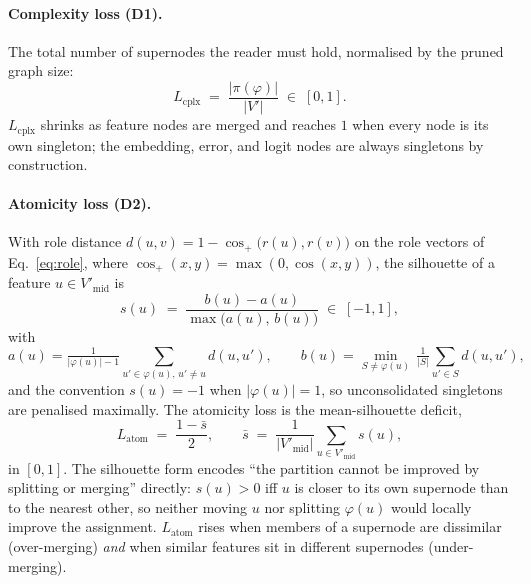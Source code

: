     \paragraph{Complexity loss (D1).}
    The total number of supernodes the reader must hold, normalised by
    the pruned graph size:
    \begin{equation}
    L_{\text{cplx}}
    \;=\;
    \frac{|\pi(\varphi)|}{|V'|}
    \;\in\; [0, 1].
    \label{eq:Lcplx}
    \end{equation}
    $L_{\text{cplx}}$ shrinks as feature nodes are merged and reaches
    $1$ when every node is its own singleton; the embedding, error, and
    logit nodes are always singletons by construction.

    \paragraph{Atomicity loss (D2).}
    With role distance $d(u, v) = 1 - \cos_{+}\!\bigl(r(u), r(v)\bigr)$ on
    the role vectors of Eq.~\eqref{eq:role}, where
    $\cos_{+}(x, y) = \max(0, \cos(x, y))$, the silhouette of a feature
    $u \in V'_{\text{mid}}$ is
    \begin{equation}
    s(u)
    \;=\;
    \frac{b(u) - a(u)}{\max\bigl(a(u),\, b(u)\bigr)}
    \;\in\; [-1, 1],
    \label{eq:silhouette}
    \end{equation}
    with
    \[
    a(u) = \tfrac{1}{|\varphi(u)| - 1}
    \sum_{u' \in \varphi(u),\, u' \ne u}\!\! d(u, u'),
    \qquad
    b(u) = \min_{S \ne \varphi(u)}\, \tfrac{1}{|S|}\!\sum_{u' \in S}\! d(u, u'),
    \]
    and the convention $s(u) = -1$ when $|\varphi(u)| = 1$, so unconsolidated
    singletons are penalised maximally. The atomicity loss is the
    mean-silhouette deficit,
    \begin{equation}
    L_{\text{atom}}
    \;=\;
    \frac{1 - \bar{s}}{2},
    \qquad
    \bar{s} \;=\; \frac{1}{|V'_{\text{mid}}|}
    \sum_{u \in V'_{\text{mid}}} s(u),
    \label{eq:Latom}
    \end{equation}
    in $[0, 1]$. The silhouette form encodes ``the partition cannot be
    improved by splitting or merging'' directly: $s(u) > 0$ iff $u$ is
    closer to its own supernode than to the nearest other, so neither
    moving $u$ nor splitting $\varphi(u)$ would locally improve the
    assignment. $L_{\text{atom}}$ rises when members of a supernode are
    dissimilar (over-merging) \emph{and} when similar features sit in
    different supernodes (under-merging).

